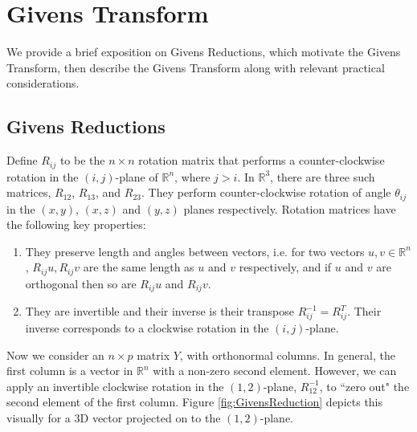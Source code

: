 \documentclass{article}
\begin{document}
\section{Givens Transform}\label{Givens}
We provide a brief exposition on Givens Reductions, which motivate the Givens Transform, then describe the Givens Transform along with relevant practical considerations.

\subsection{Givens Reductions}
Define $R_{ij}$ to be the $n \times n$ rotation matrix that performs a counter-clockwise rotation in the $(i,j)$-plane of $\mathbb{R}^n$, where $j > i$. In $\mathbb{R}^3$, there are three such matrices, $R_{12}$, $R_{13}$, and $R_{23}$. They perform counter-clockwise rotation of angle $\theta_{ij}$ in the $(x,y)$, $(x,z)$ and $(y,z)$ planes respectively. Rotation matrices have the following key properties:

\begin{enumerate}
\item They preserve length and angles between vectors, i.e. for two vectors $u,v \in \mathbb{R}^n$, $R_{ij} u, R_{ij} v$ are the same length as $u$ and $v$ respectively, and if $u$ and $v$ are orthogonal then so are $R_{ij}u$ and $R_{ij}v$.
\item They are invertible and their inverse is their transpose $R_{ij}^{-1} = R_{ij}^T$. Their inverse corresponds to a clockwise rotation in the $(i,j)$-plane.
\end{enumerate}

Now we consider an $n \times p$ matrix $Y$, with orthonormal columns. In general, the first column is a vector in $\mathbb{R}^n$ with a non-zero second element. However, we can apply an invertible clockwise rotation in the $(1,2)$-plane, $R_{12}^{-1}$, to ``zero out" the second element of the first column. Figure \ref{fig:GivensReduction} depicts this visually for a 3D vector projected on to the $(1,2)$-plane.
\end{document}
